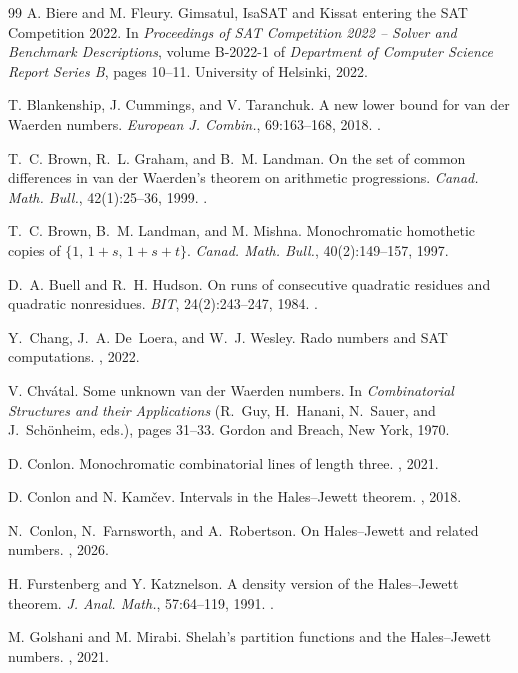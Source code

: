 \documentclass[12pt]{article}
\begin{document}
\begin{thebibliography}{99}
A. Biere and M. Fleury. Gimsatul, {IsaSAT} and {Kissat} entering the
{SAT} {Competition} 2022. In \emph{Proceedings of SAT Competition
2022 -- Solver and Benchmark Descriptions}, volume B-2022-1 of
\emph{Department of Computer Science Report Series B}, pages 10--11.
University of Helsinki, 2022.

T. Blankenship, J. Cummings, and V. Taranchuk. A new lower bound for
van der Waerden numbers. \emph{European J. Combin.}, 69:163--168, 2018.
.

T.~C. Brown, R.~L. Graham, and B.~M. Landman. On the set of common
differences in van der Waerden's theorem on arithmetic progressions.
\emph{Canad. Math. Bull.}, 42(1):25--36, 1999.
.

T.~C. Brown, B.~M. Landman, and M. Mishna. Monochromatic homothetic
copies of $\{1,\,1+s,\,1+s+t\}$. \emph{Canad. Math. Bull.},
40(2):149--157, 1997.

D.~A. Buell and R.~H. Hudson. On runs of consecutive quadratic residues
and quadratic nonresidues. \emph{BIT}, 24(2):243--247, 1984.
.

Y.~Chang, J.~A. De~Loera, and W.~J. Wesley. Rado numbers and {SAT}
computations. , 2022.

V. Chv\'atal. Some unknown van der Waerden numbers. In
\emph{Combinatorial Structures and their Applications} (R.~Guy,
H.~Hanani, N.~Sauer, and J.~Sch\"onheim, eds.), pages 31--33. Gordon
and Breach, New York, 1970.

D. Conlon. Monochromatic combinatorial lines of length three.
, 2021.

D. Conlon and N. Kam\v{c}ev. Intervals in the Hales--Jewett theorem.
, 2018.

N.~Conlon, N.~Farnsworth, and A.~Robertson. On {H}ales--{J}ewett and
related numbers. , 2026.

H. Furstenberg and Y. Katznelson. A density version of the
Hales--Jewett theorem. \emph{J. Anal. Math.}, 57:64--119, 1991.
.

M. Golshani and M. Mirabi. Shelah's partition functions and the
Hales--Jewett numbers. , 2021.


\end{thebibliography}
\end{document}
